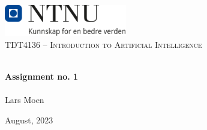 \begin{titlepage}
\vbox{ }
\vbox{ }
\begin{center}
\includegraphics[width=0.40\textwidth]{Images/NTNU_logo.png}\\[1cm]
\textsc{\Large TDT4136 – Introduction to Artificial Intelligence}\\[0.5cm]
\vbox{ }

\HRule \\[0.4cm]
{ \huge \bfseries Assignment no. 1}\\[0.4cm]
\HRule \\[1.5cm]

\large
Lars Moen
\vfill

{\large August, 2023}
\end{center}
\end{titlepage}